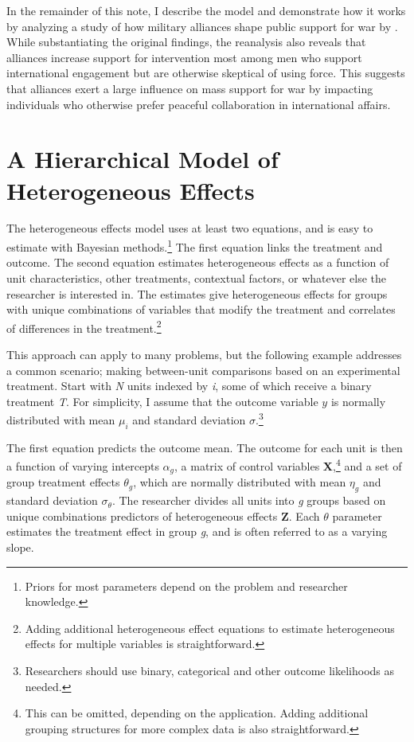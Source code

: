 \documentclass[12pt]{article}
\begin{document}
In the remainder of this note, I describe the model and demonstrate how it works by analyzing a study of how military alliances shape public support for war by \citet{TomzWeeks2021}. 
While substantiating the original findings, the reanalysis also reveals that alliances increase support for intervention most among men who support international engagement but are otherwise skeptical of using force. 
This suggests that alliances exert a large influence on mass support for war by impacting individuals who otherwise prefer peaceful collaboration in international affairs. 



\section{A Hierarchical Model of Heterogeneous Effects}


The heterogeneous effects model uses at least two equations, and is easy to estimate with Bayesian methods.\footnote{Priors for most parameters depend on the problem and researcher knowledge.} 
The first equation links the treatment and outcome. 
The second equation estimates heterogeneous effects as a function of unit characteristics, other treatments, contextual factors, or whatever else the researcher is interested in. 
The estimates give heterogeneous effects for groups with unique combinations of variables that modify the treatment and correlates of differences in the treatment.\footnote{Adding additional heterogeneous effect equations to estimate heterogeneous effects for multiple variables is straightforward.}  


This approach can apply to many problems, but the following example addresses a common scenario; making between-unit comparisons based on an experimental treatment.    
Start with \textit{N} units indexed by \textit{i}, some of which receive a binary treatment \textit{T}.
For simplicity, I assume that the outcome variable ${y}$ is normally distributed with mean $\mu_i$ and standard deviation $\sigma$.\footnote{Researchers should use binary, categorical and other outcome likelihoods as needed.}


The first equation predicts the outcome mean. 
The outcome for each unit is then a function of varying intercepts $\alpha_g$, a matrix of control variables \textbf{X},\footnote{This can be omitted, depending on the application. Adding additional grouping structures for more complex data is also straightforward.} and a set of group treatment effects $\theta_g$, which are normally distributed with mean $\eta_g$ and standard deviation $\sigma_\theta$. 
The researcher divides all units into \textit{g} groups based on unique combinations predictors of heterogeneous effects \textbf{Z}. 
Each $\theta$ parameter estimates the treatment effect in group \textit{g}, and is often referred to as a varying slope. 
\end{document}
